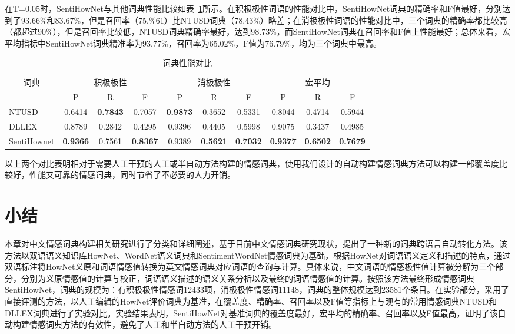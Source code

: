 在T=0.05时，SentiHowNet与其他词典性能比较如表~\ref{tab2-3}所示。在积极极性词语的性能对比中，SentiHowNet词典的精确率和F值最好，分别达到了93.66\%和83.67\%，但是召回率（75.\%61）比NTUSD词典（78.43\%）略差；在消极极性词语的性能对比中，三个词典的精确率都比较高（都超过90\%），但是召回率比较低，NTUSD词典精确率最好，达到98.73\%，而SentiHowNet词典在召回率和F值上性能最好；总体来看，宏平均指标中SentiHowNet词典精准率为93.77\%，召回率为65.02\%，F值为76.79\%，均为三个词典中最高。
\begin{table}[htp]
\centering
\caption{词典性能对比}
\label{tab2-3}
\begin{tabular}{|l|c|c|c|c|c|c|c|c|c|}
\hline
\multicolumn{1}{|c|}{\multirow{2}{*}{词典}} & \multicolumn{3}{c|}{积极极性} & \multicolumn{3}{c|}{消极极性} & \multicolumn{3}{c|}{宏平均} \\ \cline{2-10} 
\multicolumn{1}{|c|}{} & P & R & F & P & R & F & P & R & F \\ \hline
NTUSD & 0.6414 & \textbf{0.7843} & 0.7057 & \textbf{0.9873} & 0.3652 & 0.5331 & 0.8044 & 0.4714 & 0.5944 \\ \hline
DLLEX & 0.8789 & 0.2842 & 0.4295 & 0.9396 & 0.4405 & 0.5998 & 0.9075 & 0.3437 & 0.4985 \\ \hline
SentiHownet & \textbf{0.9366} & 0.7561 & \textbf{0.8367} & 0.9389 & \textbf{0.5621} & \textbf{0.7032} & \textbf{0.9377} & \textbf{0.6502} & \textbf{0.7679} \\ \hline
\end{tabular}
\end{table}

以上两个对比表明相对于需要人工干预的人工或半自动方法构建的情感词典，使用我们设计的自动构建情感词典方法可以构建一部覆盖度比较好，性能又可靠的情感词典，同时节省了不必要的人力开销。

\section{小结}
本章对中文情感词典构建相关研究进行了分类和详细阐述，基于目前中文情感词典研究现状，提出了一种新的词典跨语言自动转化方法。该方法以双语语义知识库HowNet、WordNet语义词典和SentimentWordNet情感词典为基础，根据HowNet对词语语义定义和描述的特点，通过双语标注将HowNet义原和词语情感值转换为英文情感词典对应词语的查询与计算。具体来说，中文词语的情感极性值计算被分解为三个部分，分别为义原情感值的计算与校正，词语语义描述的语义关系分析以及最终的词语情感值的计算。按照该方法最终形成情感词典SentiHowNet，词典的规模为：有积极极性情感词12433项，消极极性情感词11148，词典的整体规模达到23581个条目。在实验部分，采用了直接评测的方法，以人工编辑的HowNet评价词典为基准，在覆盖度、精确率、召回率以及F值等指标上与现有的常用情感词典NTUSD和DLLEX词典进行了实验对比。实验结果表明，SentiHowNet对基准词典的覆盖度最好，宏平均的精确率、召回率以及F值最高，证明了该自动构建情感词典方法的有效性，避免了人工和半自动方法的人工干预开销。